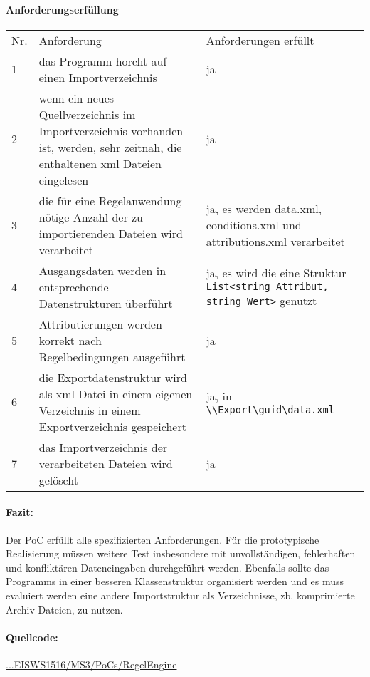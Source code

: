 \documentclass[11pt,oneside,a4paper,notitlepage]{article}
\begin{document}
\paragraph*{Anforderungserfüllung}
%
\begin{center}
\begin{tabular}{| p{20mm} | p{80mm} | p{60mm} |}
\hline
Nr. & Anforderung & Anforderungen erfüllt\\
1 & das Programm horcht auf einen Importverzeichnis & ja\\
\hline
2 & wenn ein neues Quellverzeichnis im Importverzeichnis vorhanden ist, werden, sehr zeitnah, die enthaltenen xml Dateien eingelesen & ja\\
\hline
3 & die für eine Regelanwendung nötige Anzahl der zu importierenden Dateien wird verarbeitet & ja, es werden data.xml, conditions.xml und attributions.xml verarbeitet\\
\hline
4 & Ausgangsdaten werden in entsprechende Datenstrukturen überführt & ja, es wird die eine Struktur \verb+List<string Attribut, string Wert>+ genutzt\\
\hline
5 & Attributierungen werden korrekt nach Regelbedingungen ausgeführt & ja\\
\hline
6 & die Exportdatenstruktur wird als xml Datei in einem eigenen Verzeichnis in einem Exportverzeichnis gespeichert & ja, in \verb+\\Export\guid\data.xml+ \\
\hline
7 & das Importverzeichnis der verarbeiteten Dateien wird gelöscht & ja \\
\hline
\end{tabular}
\end{center}
\paragraph*{Fazit:} Der PoC erfüllt alle spezifizierten Anforderungen. Für die prototypische Realisierung müssen weitere Test insbesondere mit unvollständigen, fehlerhaften und konfliktären Dateneingaben durchgeführt werden. Ebenfalls sollte das Programms in einer besseren Klassenstruktur organisiert werden und es muss evaluiert werden eine andere Importstruktur als Verzeichnisse, zb. komprimierte Archiv-Dateien, zu nutzen.
\paragraph*{Quellcode: } \href{https://github.com/thuascgn/EISWS1516Howe/tree/master/MS3/PoCs/RegelEngine}{...EISWS1516/MS3/PoCs/RegelEngine}
\end{document}
